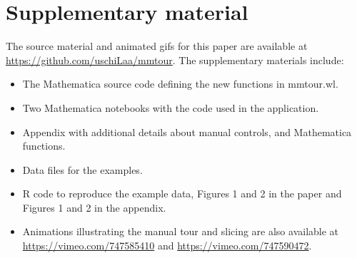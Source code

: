 \documentclass[]{interact}
\theoremstyle{plain}%
\theoremstyle{definition}
\theoremstyle{remark}
\providecommand{\tightlist}{%
  \setlength{\itemsep}{0pt}\setlength{\parskip}{0pt}}
\def\tightlist{}
\begin{document}
\hypertarget{supplementary-material}{%
\section*{Supplementary material}\label{supplementary-material}}

The source material and animated gifs for this paper are available at
\url{https://github.com/uschiLaa/mmtour}. The supplementary materials
include:

\begin{itemize}
\tightlist
\item
  The Mathematica source code defining the new functions in mmtour.wl.
\item
  Two Mathematica notebooks with the code used in the application.
\item
  Appendix with additional details about manual controls, and
  Mathematica functions.
\item
  Data files for the examples.
\item
  R code to reproduce the example data, Figures 1 and 2 in the paper and
  Figures 1 and 2 in the appendix.
\item
  Animations illustrating the manual tour and slicing are also available
  at \url{https://vimeo.com/747585410} and
  \url{https://vimeo.com/747590472}.
\end{itemize}



\end{document}
